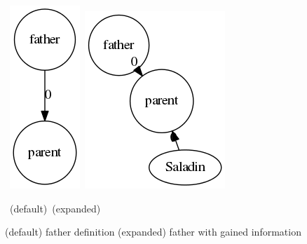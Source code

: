 \documentclass[twoside,b5paper,10pt]{article}
\begin{document}
\begin{figure}[htb]
  \vspace{3pt}
  \centerline{
  \hbox{
  \hspace{0.0in}
        \includegraphics[scale=0.5]{Figure/father.png}
        \hspace{0.1\columnwidth}
        \includegraphics[scale=0.5]{Figure/fathernew.png}
    }
  }
  \vspace{3pt}
  \hbox{\hspace{0.23\columnwidth} (default) \hspace{0.3\columnwidth} (expanded)}
  \caption{ (default) father definition (expanded) father with gained information}
  \label{fig:father}
\end{figure}
\end{document}
